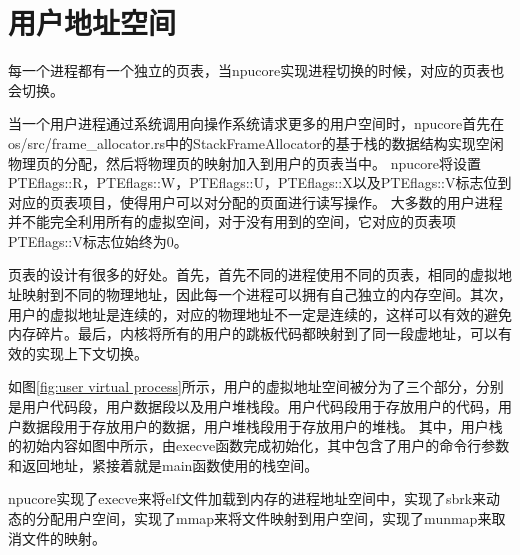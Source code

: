 \section{用户地址空间}
每一个进程都有一个独立的页表，当npucore实现进程切换的时候，对应的页表也会切换。

当一个用户进程通过系统调用向操作系统请求更多的用户空间时，npucore首先在os/src/frame_allocator.rs中的StackFrameAllocator的基于栈的数据结构实现空闲物理页的分配，然后将物理页的映射加入到用户的页表当中。
npucore将设置PTEflags::R，PTEflags::W，PTEflags::U，PTEflags::X以及PTEflags::V标志位到对应的页表项目，使得用户可以对分配的页面进行读写操作。
大多数的用户进程并不能完全利用所有的虚拟空间，对于没有用到的空间，它对应的页表项PTEflags::V标志位始终为0。

页表的设计有很多的好处。首先，首先不同的进程使用不同的页表，相同的虚拟地址映射到不同的物理地址，因此每一个进程可以拥有自己独立的内存空间。其次，用户的虚拟地址是连续的，对应的物理地址不一定是连续的，这样可以有效的避免内存碎片。最后，内核将所有的用户的跳板代码都映射到了同一段虚地址，可以有效的实现上下文切换。

如图\ref{fig:user virtual process}所示，用户的虚拟地址空间被分为了三个部分，分别是用户代码段，用户数据段以及用户堆栈段。用户代码段用于存放用户的代码，用户数据段用于存放用户的数据，用户堆栈段用于存放用户的堆栈。
其中，用户栈的初始内容如图中所示，由execve函数完成初始化，其中包含了用户的命令行参数和返回地址，紧接着就是main函数使用的栈空间。

npucore实现了execve来将elf文件加载到内存的进程地址空间中，实现了sbrk来动态的分配用户空间，实现了mmap来将文件映射到用户空间，实现了munmap来取消文件的映射。

